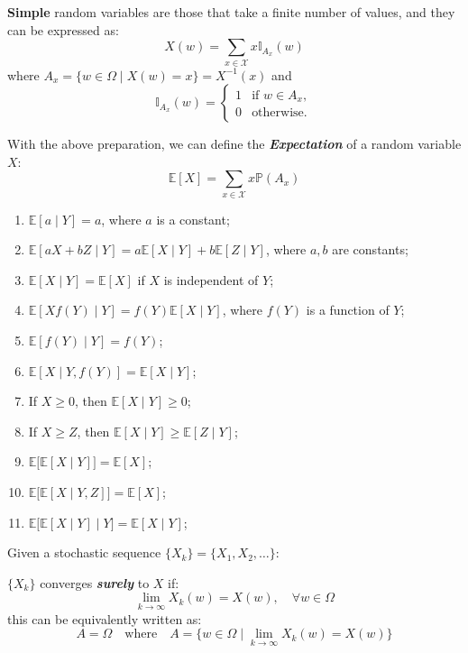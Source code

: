 \documentclass[10pt]{elegantbook}
\newcommand{\mydefination}[1]{\textbf{\textit{\textcolor{structurecolor}{#1}}}}
\begin{document}
\textbf{Simple} random variables are those that take a finite number of values, and they can be expressed as:
\[ X(w) = \sum_{x \in \mathcal X} x \mathbb{I}_{A_x}(w) \]
where $A_x = \{ w \in \Omega \mid X(w) = x \} = X^{-1}(x)$
and
\[
\mathbb{I}_{A_x}(w) = \begin{cases}
    1 & \text{if } w \in A_x, \\
    0 & \text{otherwise}.
\end{cases}
\]

With the above preparation, we can define the \mydefination{Expectation} of a random variable $X$:
\begin{equation}
    \mathbb E[X] = \sum_{x \in \mathcal X} x \mathbb P(A_x)
\end{equation}

\begin{lemma}
    \begin{enumerate}
        \item $\mathbb E[a \mid Y] = a$, where $a$ is a constant;
        \item $\mathbb E[aX + bZ \mid Y] = a \mathbb E[X \mid Y] + b \mathbb E[Z \mid Y]$, where $a, b$ are constants;
        \item $\mathbb E[X \mid Y] = \mathbb E[X]$ if $X$ is independent of $Y$;
        \item $\mathbb E[Xf(Y) \mid Y] = f(Y) \mathbb E[X \mid Y]$, where $f(Y)$ is a function of $Y$;
        \item $\mathbb E[f(Y) \mid Y] = f(Y)$;
        \item $\mathbb E[X \mid Y, f(Y)] = \mathbb E[X \mid Y]$;
        \item If $X \geq 0$, then $\mathbb E[X \mid Y] \geq 0$;
        \item If $X \geq Z$, then $\mathbb E[X \mid Y] \geq \mathbb E[Z \mid Y]$;
        \item $\mathbb E \big [ \mathbb E[X \mid Y] \big ] = \mathbb E[X]$;
        \item $\mathbb E \big [ \mathbb E[X \mid Y, Z] \big ] = \mathbb E[X]$;
        \item $\mathbb E \big [ \mathbb E[X \mid Y] \mid Y \big ] = \mathbb E[X \mid Y]$;
    \end{enumerate}
\end{lemma}

Given a stochastic sequence $\{ X_k \} = \{ X_1, X_2, \ldots \}$:
\begin{definition}
    $\{ X_k \}$ converges \mydefination{surely} to $X$ if:
    \[ \lim_{k \rightarrow \infty} X_k(w) = X(w), \quad \forall w \in \Omega \]
    this can be equivalently written as:
    \[ A = \Omega \quad \text{where} \quad A = \{ w \in \Omega \mid \lim_{k \rightarrow \infty} X_k(w) = X(w) \} \]
\end{definition}
\end{document}
